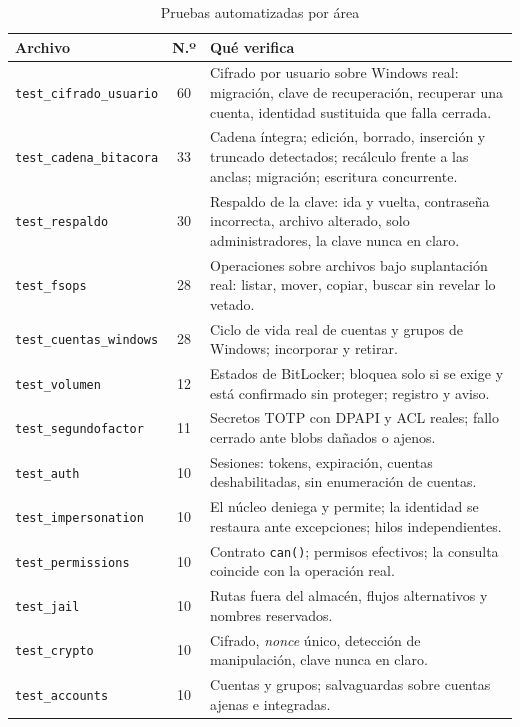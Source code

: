 \documentclass[conference]{IEEEtran}
\begin{document}
\begin{table}[!t]
\caption{Pruebas automatizadas por área}
\label{tab:suite}
\centering
\footnotesize
\setlength{\tabcolsep}{3pt}
\begin{tabular}{|>{\scriptsize}p{3.3cm}|c|p{13.2cm}|}
\hline
\textbf{Archivo} & \textbf{N.º} & \textbf{Qué verifica} \\
\hline
\texttt{test\_cifrado\_\allowbreak usuario} & 60 & Cifrado por usuario sobre Windows real: migración, clave de recuperación, recuperar una cuenta, identidad sustituida que falla cerrada. \\
\hline
\texttt{test\_cadena\_\allowbreak bitacora} & 33 & Cadena íntegra; edición, borrado, inserción y truncado detectados; recálculo frente a las anclas; migración; escritura concurrente. \\
\hline
\texttt{test\_respaldo} & 30 & Respaldo de la clave: ida y vuelta, contraseña incorrecta, archivo alterado, solo administradores, la clave nunca en claro. \\
\hline
\texttt{test\_fsops} & 28 & Operaciones sobre archivos bajo suplantación real: listar, mover, copiar, buscar sin revelar lo vetado. \\
\hline
\texttt{test\_cuentas\_\allowbreak windows} & 28 & Ciclo de vida real de cuentas y grupos de Windows; incorporar y retirar. \\
\hline
\texttt{test\_volumen} & 12 & Estados de BitLocker; bloquea solo si se exige y está confirmado sin proteger; registro y aviso. \\
\hline
\texttt{test\_segundo\-factor} & 11 & Secretos TOTP con DPAPI y ACL reales; fallo cerrado ante blobs dañados o ajenos. \\
\hline
\texttt{test\_auth} & 10 & Sesiones: tokens, expiración, cuentas deshabilitadas, sin enumeración de cuentas. \\
\hline
\texttt{test\_impersonation} & 10 & El núcleo deniega y permite; la identidad se restaura ante excepciones; hilos independientes. \\
\hline
\texttt{test\_permissions} & 10 & Contrato \texttt{can()}; permisos efectivos; la consulta coincide con la operación real. \\
\hline
\texttt{test\_jail} & 10 & Rutas fuera del almacén, flujos alternativos y nombres reservados. \\
\hline
\texttt{test\_crypto} & 10 & Cifrado, \textit{nonce} único, detección de manipulación, clave nunca en claro. \\
\hline
\texttt{test\_accounts} & 10 & Cuentas y grupos; salvaguardas sobre cuentas ajenas e integradas. \\

\end{tabular}
\end{table}
\end{document}
